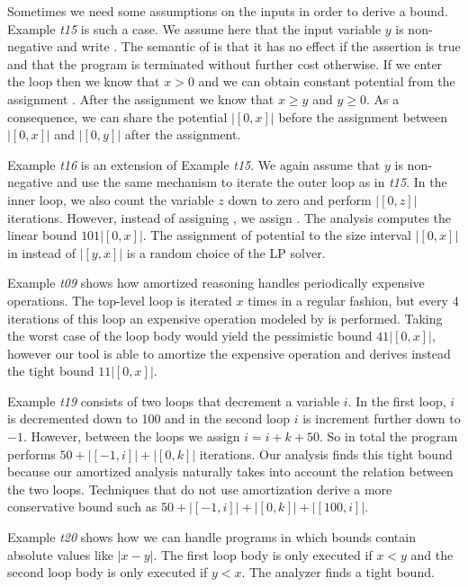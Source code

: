 \documentclass[nocopyrightspace,preprint,pldi]{sigplanconf-pldi15}
\newcommand{\iffull}[2]{\ifx\fullversion\undefined{#2}\else{#1}\fi}
\begin{document}
{Sometimes we need some assumptions on the inputs in order to derive a
bound.  Example \emph{t15} is such a case.  We assume here that the
input variable $y$ is non-negative and write .  The
semantic of  is that it has no effect if the assertion is
true and that the program is terminated without further cost
otherwise.  If we enter the loop then we know that $x>0$ and we can
obtain constant potential from the assignment .  After the
assignment we know that $x\geq y$ and $y\geq 0$.  As a consequence, we
can share the potential $|[0,x]|$ before the assignment 
between $|[0,x]|$ and $|[0,y]|$ after the assignment.  \iffull{In this way, we
derive a tight linear bound.}{}

Example \emph{t16} is an extension of Example \emph{t15}. We again
assume that $y$ is non-negative and use the same mechanism to iterate
the outer loop as in \emph{t15}.  In the inner loop, we also count the
variable $z$ down to zero and perform $|[0,z]|$ iterations.  However,
instead of assigning , we assign .  The analysis
computes the linear bound $101|[0,x]|$.  The
assignment of potential to the size interval $|[0,x]|$ in instead of
$|[y,x]|$ is a random choice of the LP solver.

Example \emph{t09} shows how amortized reasoning handles periodically
expensive operations.  The top-level loop is iterated $x$ times in
a regular fashion, but every 4 iterations of this loop an expensive
operation modeled by  is performed.  Taking the worst
case of the loop body would yield the pessimistic bound $41|[0,x]|$,
however our tool is able to amortize the expensive operation and derives
instead the tight bound $11|[0,x]|$.

Example \emph{t19} consists of two loops that decrement a variable
$i$.  In the first loop, $i$ is decremented down to 100 and in the
second loop $i$ is increment further down to $-1$.  However, between
the loops we assign $i=i+k+50$.  So in total the program performs $50
+ |[-1,i]| + |[0,k]|$ iterations.  Our analysis finds this tight bound
because our amortized analysis naturally takes into account the
relation between the two loops.  Techniques that do not use
amortization derive a more conservative bound such as $50 + |[-1,i]| +
|[0,k]| + |[100,i]|$.

Example \emph{t20} shows how we can handle programs in which bounds
contain absolute values like $|x-y|$.  The first loop body is only
executed if $x<y$ and the second loop body is only executed if $y<x$.
The analyzer finds a tight bound.

}
\end{document}

